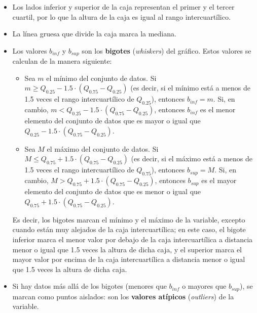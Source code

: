 \documentclass[]{book}
\theoremstyle{definition}
\theoremstyle{definition}
\theoremstyle{definition}
\theoremstyle{remark}
\begin{document}
\begin{itemize}
\item
  Los lados inferior y superior de la caja representan el primer y el tercer cuartil, por lo que la altura de la caja es igual al rango intercuartílico.
\item
  La línea gruesa que divide la caja marca la mediana.
\item
  Los valores \(b_{inf}\) y \(b_{sup}\) son los \textbf{bigotes} (\emph{whiskers}) del gráfico. Estos valores se calculan de la manera siguiente:

  \begin{itemize}
  \item
    Sea \(m\) el mínimo del conjunto de datos. Si \(m\geqslant Q_{0.25}-1.5\cdot(Q_{0.75}-Q_{0.25})\) (es decir, si el mínimo está a menos de 1.5 veces el rango intercuartílico de \(Q_{0.25}\)), entonces \(b_{inf}=m\). Si, en cambio, \(m< Q_{0.25}-1.5\cdot(Q_{0.75}-Q_{0.25})\), entonces \(b_{inf}\) es el menor elemento del conjunto de datos que es mayor o igual que \(Q_{0.25}-1.5\cdot(Q_{0.75}-Q_{0.25})\).
  \item
    Sea \(M\) el máximo del conjunto de datos. Si \(M\leqslant Q_{0.75}+1.5\cdot(Q_{0.75}-Q_{0.25})\) (es decir, si el máximo está a menos de 1.5 veces el rango intercuartílico de \(Q_{0.75}\)), entonces \(b_{sup}=M\). Si, en cambio, \(M> Q_{0.75}+1.5\cdot(Q_{0.75}-Q_{0.25})\), entonces \(b_{sup}\) es el mayor elemento del conjunto de datos que es menor o igual que \(Q_{0.75}+1.5\cdot(Q_{0.75}-Q_{0.25})\).
  \end{itemize}

  Es decir, los bigotes marcan el mínimo y el máximo de la variable, excepto cuando están muy alejados de la caja intercuartílica; en este caso, el bigote inferior marca el menor valor por debajo de la caja intercuartílica a distancia menor o igual que 1.5 veces la altura de dicha caja, y el superior marca el mayor valor por encima de la caja intercuartílica a distancia menor o igual que 1.5 veces la altura de dicha caja.
\item
  Si hay datos más allá de los bigotes (menores que \(b_{inf}\) o mayores que \(b_{sup}\)), se marcan como puntos aislados: son los \textbf{valores atípicos} (\emph{outliers}) de la variable.
\end{itemize}
\end{document}
